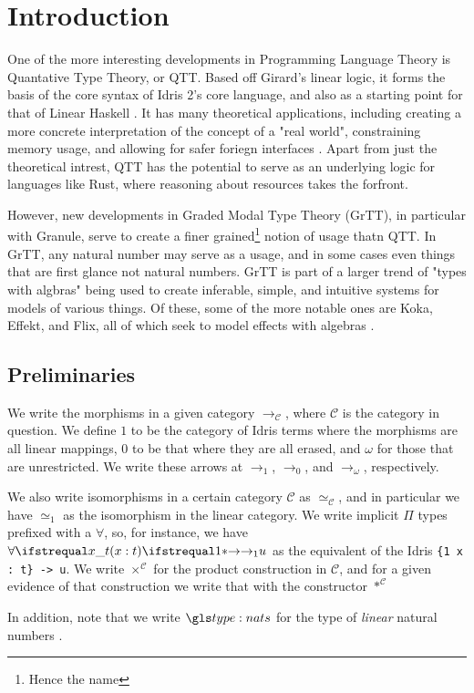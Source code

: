 \section{Introduction}

One of the more interesting developments in Programming Language Theory is Quantative Type Theory, or QTT.
Based off Girard's linear logic, it forms the basis of the core syntax of Idris 2's core language, and also as a starting point for that of Linear Haskell \cite{idris,linear_haskell,linear_logic,syntax_semantics_linear_types}.
It has many theoretical applications, including creating a more concrete interpretation of the concept of a "real world", constraining memory usage, and allowing for safer foriegn interfaces \needcite. 
Apart from just the theoretical intrest, QTT has the potential to serve as an underlying logic for languages like Rust, where reasoning about resources takes the forfront.

However, new developments in Graded Modal Type Theory (GrTT), in particular with Granule, serve to create a finer grained\footnote{Hence the name} notion of usage thatn QTT.
In GrTT, any natural number may serve as a usage, and in some cases even things that are first glance not natural numbers.
GrTT is part of a larger trend of "types with algbras" being used to create inferable, simple, and intuitive systems for models of various things.
Of these, some of the more notable ones are Koka, Effekt, and Flix, all of which seek to model effects with algebras \cite{flix_paper,effekt,koka_1}.

\subsection*{Preliminaries}

We write the morphisms in a given category $\to_{\mathcal{C}}$, where $\mathcal{C}$ is the category in question.
We define $1$ to be the category of Idris terms where the morphisms are all linear mappings, $0$ to be that where they are all erased, and $\omega$ for those that are unrestricted.
We write these arrows at $\to_1$, $\to_0$, and $\to_\omega$, respectively.

We also write isomorphisms in a certain category $\mathcal{C}$ as $\simeq_{\mathcal{C}}$, and in particular we have $\simeq_1$ as the isomorphism in the linear category.
We write implicit $\Pi$ types prefixed with a $\forall$, so, for instance, we have $\fa1 x : t . u$ as the equivalent of the Idris \verb|{1 x : t} -> u|.
We write $\times^{\mathcal{C}}$ for the product construction in $\mathcal{C}$, and for a given evidence of that construction we write that with the constructor $*^{\mathcal{C}}$

In addition, note that we write $\nat$ for the type of \emph{linear} natural numbers \needcite.
